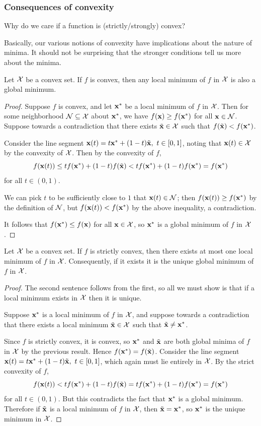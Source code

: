 \subsubsection{Consequences of convexity}
Why do we care if a function is (strictly/strongly) convex?

Basically, our various notions of convexity have implications about the nature of minima.
It should not be surprising that the stronger conditions tell us more about the minima.

\begin{proposition}
Let $\mathcal{X}$ be a convex set.
If $f$ is convex, then any local minimum of $f$ in $\mathcal{X}$ is also a global minimum.
\end{proposition}
\begin{proof}
Suppose $f$ is convex, and let $\mathbf{x}^*$ be a local minimum of $f$ in $\mathcal{X}$.
Then for some neighborhood $\mathcal{N} \subseteq \mathcal{X}$ about $\mathbf{x}^*$, we have $f(\mathbf{x}) \geq f(\mathbf{x}^*)$ for all $\mathbf{x} \in \mathcal{N}$.
Suppose towards a contradiction that there exists $\tilde{\mathbf{x}} \in \mathcal{X}$ such that $f(\tilde{\mathbf{x}}) < f(\mathbf{x}^*)$.

Consider the line segment $\mathbf{x}(t) = t\mathbf{x}^* + (1-t)\tilde{\mathbf{x}}, ~ t \in [0,1]$, noting that $\mathbf{x}(t) \in \mathcal{X}$ by the convexity of $\mathcal{X}$.
Then by the convexity of $f$,
\[f(\mathbf{x}(t)) \leq tf(\mathbf{x}^*) + (1-t)f(\tilde{\mathbf{x}}) < tf(\mathbf{x}^*) + (1-t)f(\mathbf{x}^*) = f(\mathbf{x}^*)\]
for all $t \in (0,1)$.

We can pick $t$ to be sufficiently close to $1$ that $\mathbf{x}(t) \in \mathcal{N}$; then $f(\mathbf{x}(t)) \geq f(\mathbf{x}^*)$ by the definition of $\mathcal{N}$, but $f(\mathbf{x}(t)) < f(\mathbf{x}^*)$ by the above inequality, a contradiction.

It follows that $f(\mathbf{x}^*) \leq f(\mathbf{x})$ for all $\mathbf{x} \in \mathcal{X}$, so $\mathbf{x}^*$ is a global minimum of $f$ in $\mathcal{X}$.
\end{proof}

\begin{proposition}
Let $\mathcal{X}$ be a convex set.
If $f$ is strictly convex, then there exists at most one local minimum of $f$ in $\mathcal{X}$.
Consequently, if it exists it is the unique global minimum of $f$ in $\mathcal{X}$.
\end{proposition}
\begin{proof}
The second sentence follows from the first, so all we must show is that if a local minimum exists in $\mathcal{X}$ then it is unique.

Suppose $\mathbf{x}^*$ is a local minimum of $f$ in $\mathcal{X}$, and suppose towards a contradiction that there exists a local minimum $\tilde{\mathbf{x}} \in \mathcal{X}$ such that $\tilde{\mathbf{x}} \neq \mathbf{x}^*$.

Since $f$ is strictly convex, it is convex, so $\mathbf{x}^*$ and $\tilde{\mathbf{x}}$ are both global minima of $f$ in $\mathcal{X}$ by the previous result.
Hence $f(\mathbf{x}^*) = f(\tilde{\mathbf{x}})$.
Consider the line segment $\mathbf{x}(t) = t\mathbf{x}^* + (1-t)\tilde{\mathbf{x}}, ~ t \in [0,1]$, which again must lie entirely in $\mathcal{X}$.
By the strict convexity of $f$,
\[f(\mathbf{x}(t)) < tf(\mathbf{x}^*) + (1-t)f(\tilde{\mathbf{x}}) = tf(\mathbf{x}^*) + (1-t)f(\mathbf{x}^*) = f(\mathbf{x}^*)\]
for all $t \in (0,1)$.
But this contradicts the fact that $\mathbf{x}^*$ is a global minimum.
Therefore if $\tilde{\mathbf{x}}$ is a local minimum of $f$ in $\mathcal{X}$, then $\tilde{\mathbf{x}} = \mathbf{x}^*$, so $\mathbf{x}^*$ is the unique minimum in $\mathcal{X}$.
\end{proof}

